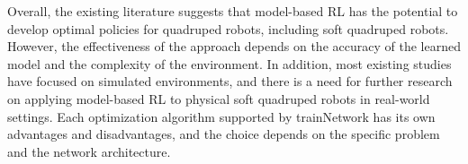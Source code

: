 Overall, the existing literature suggests that model-based RL has the potential to develop optimal policies for quadruped robots, including soft quadruped robots. However, the effectiveness of the approach depends on the accuracy of the learned model and the complexity of the environment. In addition, most existing studies have focused on simulated environments, and there is a need for further research on applying model-based RL to physical soft quadruped robots in real-world settings.
Each optimization algorithm supported by trainNetwork has its own advantages and disadvantages, and the choice depends on the specific problem and the network architecture. 

